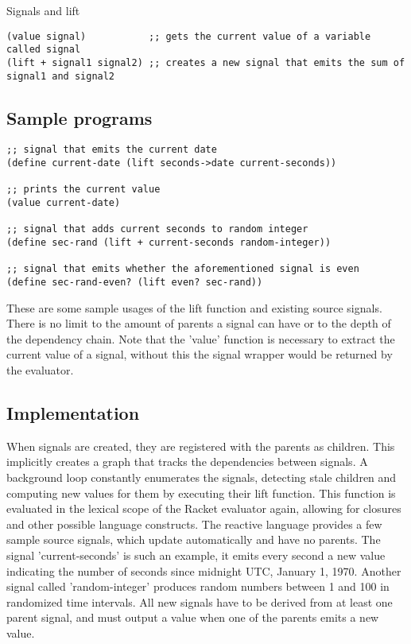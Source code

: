 Signals and lift
\begin{lstlisting}
(value signal)           ;; gets the current value of a variable called signal
(lift + signal1 signal2) ;; creates a new signal that emits the sum of signal1 and signal2
\end{lstlisting}

\subsection{Sample programs}

\begin{lstlisting}
;; signal that emits the current date
(define current-date (lift seconds->date current-seconds)) 

;; prints the current value
(value current-date)       

;; signal that adds current seconds to random integer                                
(define sec-rand (lift + current-seconds random-integer))  

;; signal that emits whether the aforementioned signal is even
(define sec-rand-even? (lift even? sec-rand))			   
\end{lstlisting}

These are some sample usages of the lift function and existing source signals. There is no limit to the amount of parents a signal can have or to the depth of the dependency chain. Note that the 'value' function is necessary to extract the current value of a signal, without this the signal wrapper would be returned by the evaluator. 

\newpage
\subsection{Implementation}

When signals are created, they are registered with the parents as children. This implicitly creates a graph that tracks the dependencies between signals. A background loop constantly enumerates the signals, detecting stale children and computing new values for them by executing their lift function. This function is evaluated in the lexical scope of the Racket evaluator again, allowing for closures and other possible language constructs. 
The reactive language provides a few sample source signals, which update automatically and have no parents. The signal 'current-seconds' is such an example, it emits every second a new value indicating the number of seconds since midnight UTC, January 1, 1970. Another signal called 'random-integer' produces random numbers between 1 and 100 in randomized time intervals. 
All new signals have to be derived from at least one parent signal, and must output a value when one of the parents emits a new value.

